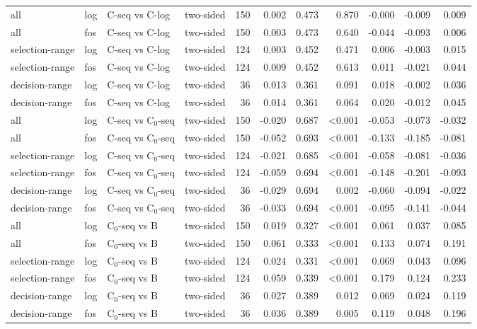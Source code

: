 \begin{longtable}{llllrrrrrrr}
all & log & C-seq vs C-log & two-sided & 150 & 0.002 & 0.473 & 0.870 & -0.000 & -0.009 & 0.009 \\
all & fos & C-seq vs C-log & two-sided & 150 & 0.003 & 0.473 & 0.640 & -0.044 & -0.093 & 0.006 \\
selection-range & log & C-seq vs C-log & two-sided & 124 & 0.003 & 0.452 & 0.471 & 0.006 & -0.003 & 0.015 \\
selection-range & fos & C-seq vs C-log & two-sided & 124 & 0.009 & 0.452 & 0.613 & 0.011 & -0.021 & 0.044 \\
decision-range & log & C-seq vs C-log & two-sided & 36 & 0.013 & 0.361 & 0.091 & 0.018 & -0.002 & 0.036 \\
decision-range & fos & C-seq vs C-log & two-sided & 36 & 0.014 & 0.361 & 0.064 & 0.020 & -0.012 & 0.045 \\
all & log & C-seq vs C$_0$-seq & two-sided & 150 & -0.020 & 0.687 & <0.001 & -0.053 & -0.073 & -0.032 \\
all & fos & C-seq vs C$_0$-seq & two-sided & 150 & -0.052 & 0.693 & <0.001 & -0.133 & -0.185 & -0.081 \\
selection-range & log & C-seq vs C$_0$-seq & two-sided & 124 & -0.021 & 0.685 & <0.001 & -0.058 & -0.081 & -0.036 \\
selection-range & fos & C-seq vs C$_0$-seq & two-sided & 124 & -0.059 & 0.694 & <0.001 & -0.148 & -0.201 & -0.093 \\
decision-range & log & C-seq vs C$_0$-seq & two-sided & 36 & -0.029 & 0.694 & 0.002 & -0.060 & -0.094 & -0.022 \\
decision-range & fos & C-seq vs C$_0$-seq & two-sided & 36 & -0.033 & 0.694 & <0.001 & -0.095 & -0.141 & -0.044 \\
all & log & C$_0$-seq vs B & two-sided & 150 & 0.019 & 0.327 & <0.001 & 0.061 & 0.037 & 0.085 \\
all & fos & C$_0$-seq vs B & two-sided & 150 & 0.061 & 0.333 & <0.001 & 0.133 & 0.074 & 0.191 \\
selection-range & log & C$_0$-seq vs B & two-sided & 124 & 0.024 & 0.331 & <0.001 & 0.069 & 0.043 & 0.096 \\
selection-range & fos & C$_0$-seq vs B & two-sided & 124 & 0.059 & 0.339 & <0.001 & 0.179 & 0.124 & 0.233 \\
decision-range & log & C$_0$-seq vs B & two-sided & 36 & 0.027 & 0.389 & 0.012 & 0.069 & 0.024 & 0.119 \\
decision-range & fos & C$_0$-seq vs B & two-sided & 36 & 0.036 & 0.389 & 0.005 & 0.119 & 0.048 & 0.196 \\

\end{longtable}
